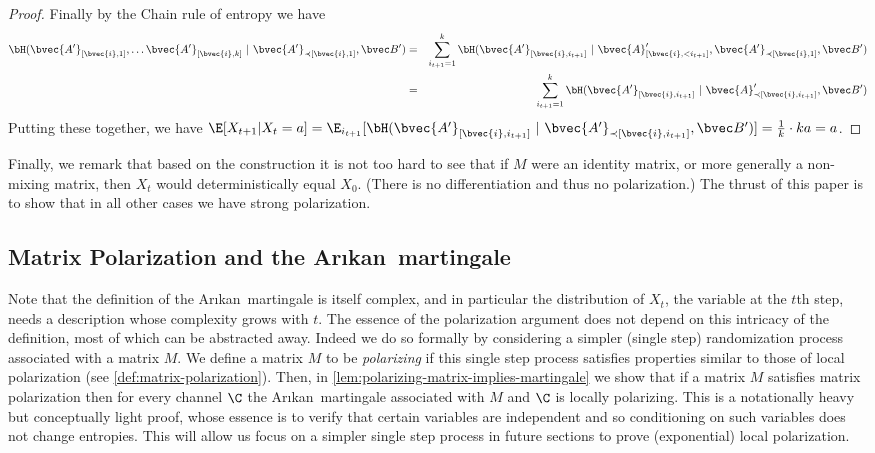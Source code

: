 \documentclass[11pt]{article}
\newcommand{\Arikan}{Ar\i kan}
\begin{document}
\begin{proof}
	Finally by the Chain rule of entropy we have
	\begin{eqnarray*}
		\bH(\bvec{A'}_{[\bvec{i}, 1]}, \ldots \bvec{A'}_{[\bvec{i},k]} ~|~ \bvec{A'}_{\prec [\bvec{i}, 1]}, \bvec B')
		& = & \sum_{i_{t+1} = 1}^k \bH(\bvec{A'}_{[\bvec{i}, i_{t+1}]} ~|~ \bvec{A}'_{[\bvec{i}, <i_{t+1}]}, \bvec{A'}_{\prec [\bvec{i}, 1]}, \bvec B') \\
		& = &
		\sum_{i_{t+1} = 1}^k \bH(\bvec{A'}_{[\bvec{i}, i_{t+1}]} ~|~ \bvec{A}'_{\prec [\bvec{i}, i_{t+1}]}, \bvec B')
	\end{eqnarray*}
	Putting these together, we have $\E[X_{t + 1} | X_t = a] = \E_{i_{t+1}} [ \bH(\bvec{A'}_{[\bvec{i}, i_{t+1}]} ~|~ \bvec{A'}_{\prec [\bvec{i}, i_{t+1}]}, \bvec B') ] = \frac 1k\cdot ka=a$.
\end{proof}

Finally, we remark that based on the construction it is not too hard to see that if $M$ were an identity matrix, or more generally a non-mixing matrix, then $X_t$ would deterministically equal $X_0$. (There is no differentiation and thus no polarization.) The thrust of this paper is to show that in all other cases we have strong polarization.

\subsection{Matrix Polarization and the \Arikan\ martingale}

Note that the definition of the \Arikan\ martingale is itself complex, and in particular the distribution of $X_t$, the variable at the $t$th step, needs a description whose complexity grows with $t$. The essence of the polarization argument does not depend on this intricacy of the definition, most of which can be abstracted away. Indeed we do so formally by considering a simpler (single step) randomization process associated with a matrix $M$.
We define a matrix $M$ to be {\em polarizing} if this single step process satisfies properties similar to those of local polarization (see \cref{def:matrix-polarization}). Then, in \cref{lem:polarizing-matrix-implies-martingale} we show that if a matrix $M$ satisfies matrix polarization then for every channel $\C$ the \Arikan\ martingale associated with $M$ and $\C$ is locally polarizing. This is a notationally heavy but conceptually light proof, whose essence is to verify that certain variables are independent and so conditioning on such variables does not change entropies. This will allow us focus on a simpler single step process in future sections to prove (exponential) local polarization.
\end{document}
